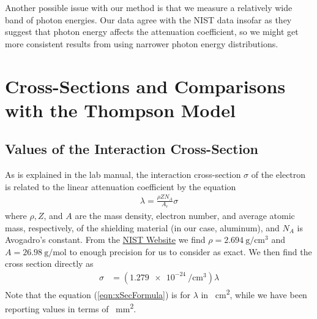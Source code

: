 \documentclass[letter]{article}
\begin{document}
Another possible issue with our method is that we measure a relatively wide band of photon energies. Our data agree with the NIST data insofar as they suggest that photon energy affects the attenuation coefficient, so we might get more consistent results from using narrower photon energy distributions.



\section{Cross-Sections and Comparisons with the Thompson Model}

\subsection{Values of the Interaction Cross-Section}

As is explained in the lab manual, the interaction cross-section $\sigma$ of the electron is related to the linear attenuation coefficient by the equation
\begin{align}
\lambda = \frac{\rho Z N_A}{A_r} \sigma
\end{align}
where $\rho, Z$, and $A$ are the mass density, electron number, and average atomic mass, respectively, of the shielding material (in our case, aluminum), and $N_A$ is Avogadro's constant. From the \href{https://physics.nist.gov/cgi-bin/ffast/ffast.pl?Formula=Al&gtype=0&lower=&upper=&density=}{NIST Website} we find $\rho = \qty{2.694}{\g\per\cm\cubed}$ and ${A = \qty{26.98}{\g\per\mol}}$ to enough precision for us to consider as exact. We then find the cross section directly as
\begin{align}
\sigma &= \left( \qty{1.279e-24}{\per\cm\cubed} \right) \lambda  \label{eqn:xSecFormula}
\end{align} 
Note that the equation (\ref{eqn:xSecFormula}) is for $\lambda$ in \unit{\per\cm\squared}, while we have been reporting values in terms of \unit{\per\mm\squared}.
\end{document}
